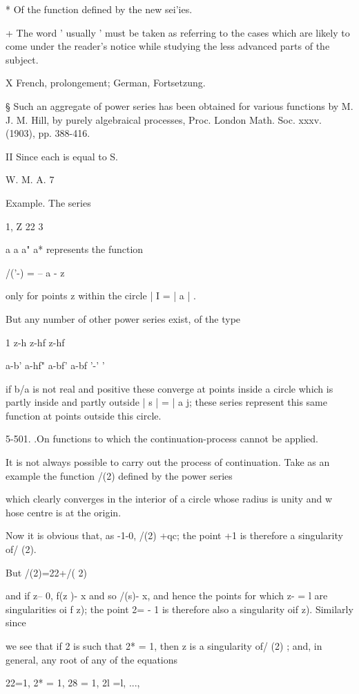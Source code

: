 {{* Of the function defined by the new sei'ies.

+ The word ' usually ' must be taken as referring to the cases which
are likely to come under the reader's notice while studying the less
advanced parts of the subject.

X French, prolongement; German, Fortsetzung.

§ Such an aggregate of power series has been obtained for various
functions by M. J. M. Hill, by purely algebraical processes, Proc.
London Math. Soc. xxxv. (1903), pp. 388-416.

II Since each is equal to S.

W. M. A. 7

%
%

Example. The series

1, Z 22 3

a a a" a* represents the function

/('-) = -- a - z

only for points z within the circle | I = | a | .

But any number of other power series exist, of the type

1 z-h z-hf z-hf

a-b' a-hf" a-bf' a-bf '-' '

if b/a is not real and positive these converge at points inside a
circle which is partly inside and partly outside | s | = | a j; these
series represent this same function at points outside this circle.

5-501. .On functions to which the continuation-process cannot be
applied.

It is not always possible to carry out the process of continuation.
Take as an example the function /(2) defined by the power series

which clearly converges in the interior of a circle whose radius is
unity and w hose centre is at the origin.

Now it is obvious that, as -1-0, /(2) +qc; the point +1 is therefore
a singularity of/ (2).

But /(2)=22+/( 2)

and if z-- 0, f(z )- x and so /(s)- x, and hence the points for which
z- = l are singularities oi f z); the point 2= - 1 is therefore also
a singularity oif z). Similarly since

we see that if 2 is such that 2* = 1, then z is a singularity of/ (2)
; and, in general, any root of any of the equations

22=1, 2* = 1, 28 = 1, 2l =l, ...,

}}
